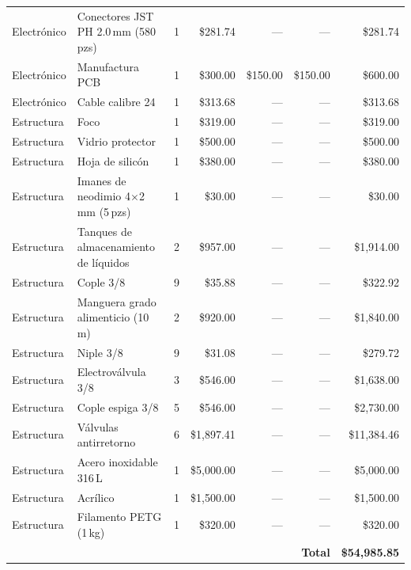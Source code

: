 \begin{longtable}{@{} l p{4.8cm} c r r r r @{}}
Electrónico & Conectores JST PH 2.0\,mm (580\,pzs)          & 1 &   \$281.74   & ---        & ---        &   \$281.74 \\
Electrónico & Manufactura PCB                               & 1 &   \$300.00   & \$150.00   & \$150.00   &   \$600.00 \\
Electrónico & Cable calibre 24                              & 1 &   \$313.68   & ---        & ---        &   \$313.68 \\
\midrule
Estructura & Foco                                           & 1 &   \$319.00   & --- & --- &    \$319.00  \\
Estructura & Vidrio protector                               & 1 &   \$500.00   & --- & --- &    \$500.00  \\
Estructura & Hoja de silicón                                & 1 &   \$380.00   & --- & --- &    \$380.00  \\
Estructura & Imanes de neodimio 4$\times$2\,mm (5\,pzs)    & 1 &    \$30.00   & --- & --- &     \$30.00  \\
Estructura & Tanques de almacenamiento de líquidos          & 2 &   \$957.00   & --- & --- & \$1{,}914.00 \\
Estructura & Cople 3/8                                      & 9 &    \$35.88   & --- & --- &    \$322.92  \\
Estructura & Manguera grado alimenticio (10\,m)             & 2 &   \$920.00   & --- & --- & \$1{,}840.00 \\
Estructura & Niple 3/8                                      & 9 &    \$31.08   & --- & --- &    \$279.72  \\
Estructura & Electroválvula 3/8                             & 3 &   \$546.00   & --- & --- & \$1{,}638.00 \\
Estructura & Cople espiga 3/8                               & 5 &   \$546.00   & --- & --- & \$2{,}730.00 \\
Estructura & Válvulas antirretorno                          & 6 & \$1{,}897.41 & --- & --- & \$11{,}384.46 \\
Estructura & Acero inoxidable 316\,L                        & 1 & \$5{,}000.00 & --- & --- & \$5{,}000.00  \\
Estructura & Acrílico                                       & 1 & \$1{,}500.00 & --- & --- & \$1{,}500.00  \\
Estructura & Filamento PETG (1\,kg)                         & 1 &   \$320.00   & --- & --- &    \$320.00  \\
\midrule
\multicolumn{6}{r}{\textbf{Total}} & \textbf{\$54{,}985.85} \\
\end{longtable}
\endgroup
